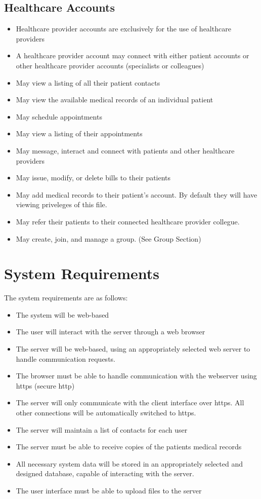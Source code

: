 \documentclass[10pt]{report}
\begin{document}
\section{Healthcare Accounts}
\begin{itemize}
\item Healthcare provider accounts are exclusively for the use of healthcare providers
\item A healthcare provider account may connect with either patient accounts or other healthcare provider accounts (specialists or colleagues)
\item May view a listing of all their patient contacts
\item May view the available medical records of an individual patient
\item May schedule appointments
\item May view a listing of their appointments
\item May message, interact and connect with patients and other healthcare providers
\item May issue, modify, or delete bills to their patients
\item May add medical records to their patient's account. By default they will have viewing priveleges of this file.
\item May refer their patients to their connected healthcare provider collegue.
\item May create, join, and manage a group. (See Group Section)
\end{itemize}

\chapter{System Requirements}
The system requirements are as follows:
\begin{itemize}
\item The system will be web-based
\item The user will interact with the server through a web browser
\item The server will be web-based, using an appropriately selected web server to handle communication requests.
\item The browser must be able to handle communication with the webserver using https (secure http)
\item The server will only communicate with the client interface over https.  All other connections will be automatically switched to https.
\item The server will maintain a list of contacts for each user
\item The server must be able to receive copies of the patients medical records
\item All necessary system data will be stored in an appropriately selected and designed database, capable of interacting with the server.
\item The user interface must be able to upload files to the server
\end{itemize}
\end{document}
